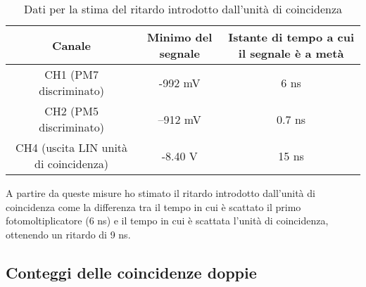 \documentclass{article}
\begin{document}
\begin{table}[h!]
    \centering
    \begin{tabular}{|c|c|c|}
        \hline
        Canale & Minimo del segnale & Istante di tempo a cui il segnale è a metà\\
        \hline
            CH1 (PM7 discriminato) & -992 mV & 6 ns \\
            CH2 (PM5 discriminato)& --912 mV& 0.7 ns   \\
            CH4 (uscita LIN unità di coincidenza) & -8.40 V & 15 ns\\
        \hline
    \end{tabular}
    \caption{Dati per la stima del ritardo introdotto dall'unità di coincidenza}
    \label{tab3}
\end{table}
A partire da queste misure ho stimato il ritardo introdotto dall'unità di coincidenza come la differenza tra il tempo in cui è scattato il primo fotomoltiplicatore (6 ns) e il tempo in cui è scattata l'unità di coincidenza, ottenendo un ritardo di 9 ns.

\subsection{Conteggi delle coincidenze doppie}
\end{document}
